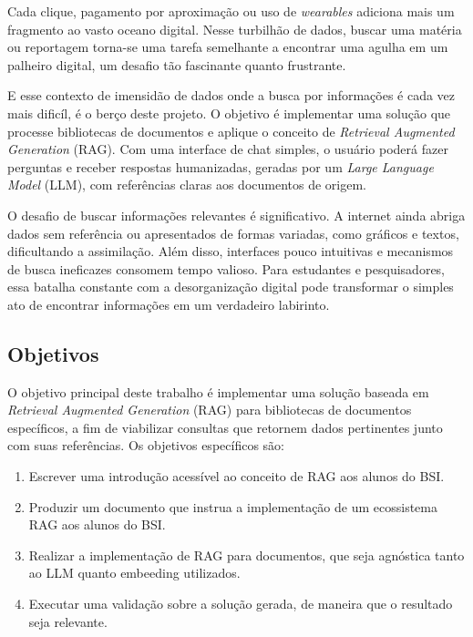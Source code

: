\documentclass[a4paper, 12pt]{article}
\begin{document}
    Cada clique, pagamento por aproximação ou uso de \textit{wearables} adiciona mais um fragmento ao vasto oceano digital. Nesse turbilhão de dados, buscar uma matéria ou reportagem torna-se uma tarefa semelhante a encontrar uma agulha em um palheiro digital, um desafio tão fascinante quanto frustrante.

    E esse contexto de imensidão de dados onde a busca por informações é cada vez mais dificíl, é o berço deste projeto. O objetivo é implementar uma solução que processe bibliotecas de documentos e aplique o conceito de \textit{Retrieval Augmented Generation} (RAG). Com uma interface de chat simples, o usuário poderá fazer perguntas e receber respostas humanizadas, geradas por um \textit{Large Language Model} (LLM), com referências claras aos documentos de origem.

    O desafio de buscar informações relevantes é significativo. A internet ainda abriga dados sem referência ou apresentados de formas variadas, como gráficos e textos, dificultando a assimilação. Além disso, interfaces pouco intuitivas e mecanismos de busca ineficazes consomem tempo valioso. Para estudantes e pesquisadores, essa batalha constante com a desorganização digital pode transformar o simples ato de encontrar informações em um verdadeiro labirinto.

    \subsection{Objetivos}

    O objetivo principal deste trabalho é implementar uma solução baseada em \textit{Retrieval Augmented Generation} (RAG) para bibliotecas de documentos específicos, a fim de viabilizar consultas que retornem dados pertinentes junto com suas referências. Os objetivos específicos são:
    
    \begin{enumerate}
        \item Escrever uma introdução acessível ao conceito de RAG aos alunos do BSI.
        \item Produzir um documento que instrua a implementação de um ecossistema RAG aos alunos do BSI.
        \item Realizar a implementação de RAG para documentos, que seja agnóstica tanto ao LLM quanto embeeding utilizados.
        \item Executar uma validação sobre a solução gerada, de maneira que o resultado seja relevante.
    \end{enumerate}
\end{document}
